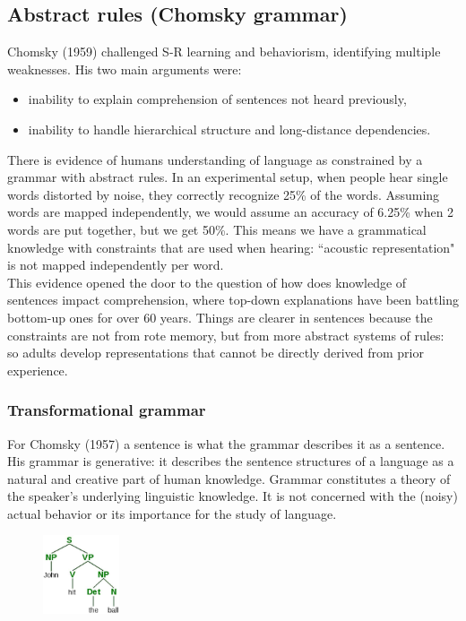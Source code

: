 \subsection{Abstract rules (Chomsky grammar)}
Chomsky (1959) challenged S-R learning and behaviorism, identifying multiple weaknesses. His two main arguments were:
\begin{itemize}
    \item inability to explain comprehension of sentences not heard previously,
    \item inability to handle hierarchical structure and long-distance dependencies.
\end{itemize}

There is evidence of humans understanding of language as constrained by a grammar with abstract rules.
In an experimental setup, when people hear single words distorted by noise, they correctly recognize 25\% of the words. Assuming words are mapped independently, we would assume an accuracy of 6.25\% when 2 words are put together, but we get 50\%. This means we have a grammatical knowledge with constraints that are used when hearing: ``acoustic representation" is not mapped independently per word.\\

This evidence opened the door to the question of how does knowledge of sentences impact comprehension, where top-down explanations have been battling bottom-up ones for over 60 years.
Things are clearer in sentences because the constraints are not from rote memory, but from more abstract systems of rules: so adults develop representations that cannot be directly derived from prior experience.

\subsubsection{Transformational grammar}
For Chomsky (1957) a sentence is what the grammar describes it as a sentence.
His grammar is generative: it describes the sentence structures of a language as a natural and creative part of human knowledge.
Grammar constitutes a theory of the speaker's underlying linguistic 
knowledge. It is not concerned with the (noisy) actual behavior or its importance for the study of language.\\

\begin{figure}
  \centering
  \includegraphics[width=0.2\textwidth]{images/tree.png}
  \caption{}
  \label{fig:tree}
\end{figure}

